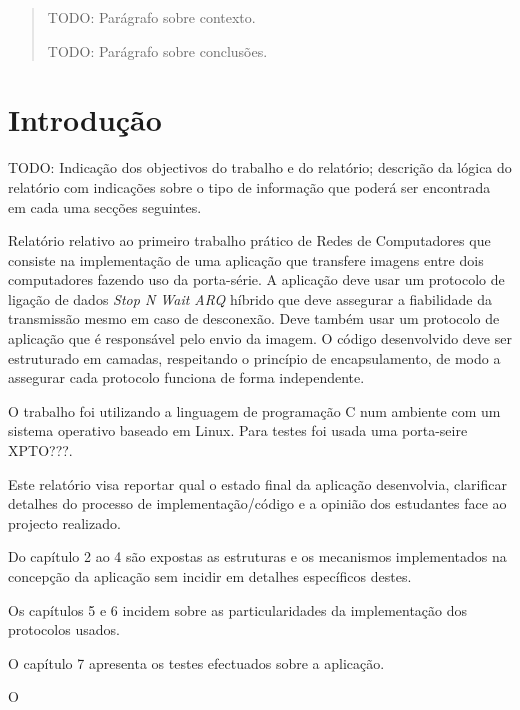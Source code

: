 \documentclass[11pt,a4paper,reqno]{report}
\numberwithin{equation}{section}
\begin{document}



\begin{abstract}
	
TODO: Parágrafo sobre contexto.

TODO: Parágrafo sobre conclusões.

\end{abstract}

\tableofcontents


\chapter{Introdução}

TODO: Indicação dos objectivos do trabalho e do relatório; descrição da lógica do relatório com indicações sobre o tipo de informação que poderá ser encontrada em cada uma secções seguintes.

Relatório relativo ao primeiro trabalho prático de Redes de Computadores que consiste na implementação de uma aplicação que transfere imagens entre dois computadores fazendo uso da porta-série. A aplicação deve usar um protocolo de ligação de dados \emph{Stop N Wait ARQ} híbrido que deve assegurar a fiabilidade  da transmissão mesmo em caso de desconexão. Deve também usar um protocolo de aplicação que é responsável pelo envio da imagem. O código desenvolvido deve ser estruturado em camadas, respeitando o princípio de encapsulamento, de modo a assegurar cada protocolo funciona de forma independente.
	
	O trabalho foi utilizando a linguagem de programação C num ambiente com um sistema operativo baseado em Linux. Para testes foi usada uma porta-seire XPTO???.
	
	Este relatório visa reportar qual o estado final da aplicação desenvolvia, clarificar detalhes do processo de implementação/código e a opinião dos estudantes face ao projecto realizado.
	
	Do capítulo 2 ao 4 são expostas as estruturas e os mecanismos implementados na concepção da aplicação sem incidir em detalhes específicos destes.
	
	Os capítulos 5 e 6 incidem sobre as particularidades da implementação dos protocolos usados.
	
	O capítulo 7 apresenta os testes efectuados sobre a aplicação.
	
	O 
	
	
\end{document}
